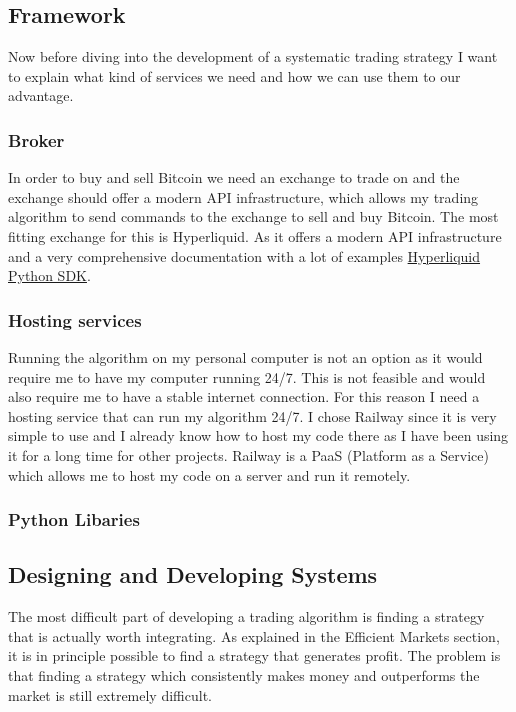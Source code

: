 \documentclass[12pt]{article}
\begin{document}
\newpage
\subsection*{Framework}
Now before diving into the development of a systematic trading strategy I want to explain what kind of services we need and how we can use them to our advantage.

\subsubsection*{Broker}
In order to buy and sell Bitcoin we need an exchange to trade on and the exchange should offer a modern API infrastructure, which allows my trading algorithm to send commands to the exchange to sell and buy Bitcoin. The most fitting exchange for this is Hyperliquid. As it offers a modern API infrastructure and a very comprehensive documentation with a lot of examples \href{https://github.com/hyperliquid-dex/hyperliquid-python-sdk}{Hyperliquid Python SDK}.   

\subsubsection*{Hosting services}
Running the algorithm on my personal computer is not an option as it would require me to have my computer running 24/7. This is not feasible and would also require me to have a stable internet connection. For this reason I need a hosting service that can run my algorithm 24/7. I chose Railway since it is very simple to use and I already know how to host my code there as I have been using it for a long time for other projects. Railway is a PaaS (Platform as a Service) which allows me to host my code on a server and run it remotely.


\subsubsection*{Python Libaries}




\newpage
\subsection*{Designing and Developing Systems}


The most difficult part of developing a trading algorithm is finding a strategy that is actually worth integrating. As explained in the Efficient Markets section, it is in principle possible to find a strategy that generates profit. The problem is that finding a strategy which consistently makes money and outperforms the market is still extremely difficult.
\end{document}
